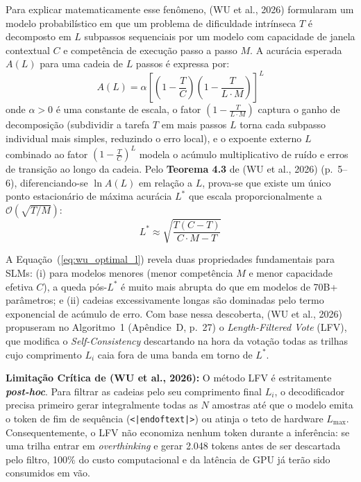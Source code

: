 \documentclass[9pt,conference]{IEEEtran}
\begin{document}
Para explicar matematicamente esse fen\^{o}meno, (WU et al., 2026) formularam um modelo probabil\'{i}stico em que um problema de dificuldade intr\'{i}nseca $T$ \'{e} decomposto em $L$ subpassos sequenciais por um modelo com capacidade de janela contextual $C$ e compet\^{e}ncia de execu\c{c}\~{a}o passo a passo $M$. A acur\'{a}cia esperada $A(L)$ para uma cadeia de $L$ passos \'{e} expressa por:
\begin{equation}
A(L) = \alpha \left[ \left(1 - \frac{T}{C}\right) \left(1 - \frac{T}{L \cdot M}\right) \right]^L
\label{eq:wu_inverted_u}
\end{equation}
onde $\alpha > 0$ \'{e} uma constante de escala, o fator $\left(1 - \frac{T}{L \cdot M}\right)$ captura o ganho de decomposi\c{c}\~{a}o (subdividir a tarefa $T$ em mais passos $L$ torna cada subpasso individual mais simples, reduzindo o erro local), e o expoente externo $L$ combinado ao fator $\left(1 - \frac{T}{C}\right)^L$ modela o ac\'{u}mulo multiplicativo de ru\'{i}do e erros de transi\c{c}\~{a}o ao longo da cadeia. Pelo \textbf{Teorema 4.3} de (WU et al., 2026) (p.~5--6), diferenciando-se $\ln A(L)$ em rela\c{c}\~{a}o a $L$, prova-se que existe um \'{u}nico ponto estacion\'{a}rio de m\'{a}xima acur\'{a}cia $L^*$ que escala proporcionalmente a $\mathcal{O}(\sqrt{T/M})$:
\begin{equation}
L^* \approx \sqrt{\frac{T(C - T)}{C \cdot M - T}}
\label{eq:wu_optimal_l}
\end{equation}

A Equa\c{c}\~{a}o~(\ref{eq:wu_optimal_l}) revela duas propriedades fundamentais para SLMs: (i) para modelos menores (menor compet\^{e}ncia $M$ e menor capacidade efetiva $C$), a queda p\'{o}s-$L^*$ \'{e} muito mais abrupta do que em modelos de 70B+ par\^{a}metros; e (ii) cadeias excessivamente longas s\~{a}o dominadas pelo termo exponencial de ac\'{u}mulo de erro. Com base nessa descoberta, (WU et al., 2026) propuseram no Algoritmo~1 (Ap\^{e}ndice~D, p.~27) o \textit{Length-Filtered Vote} (LFV), que modifica o \textit{Self-Consistency} descartando na hora da vota\c{c}\~{a}o todas as trilhas cujo comprimento $L_i$ caia fora de uma banda em torno de $L^*$.

\textbf{Limita\c{c}\~{a}o Cr\'{i}tica de (WU et al., 2026):} O m\'{e}todo LFV \'{e} estritamente \textbf{\textit{post-hoc}}. Para filtrar as cadeias pelo seu comprimento final $L_i$, o decodificador precisa primeiro gerar integralmente todas as $N$ amostras at\'{e} que o modelo emita o token de fim de sequ\^{e}ncia (\texttt{<|endoftext|>}) ou atinja o teto de hardware $L_{\max}$. Consequentemente, o LFV n\~{a}o economiza nenhum token durante a infer\^{e}ncia: se uma trilha entrar em \textit{overthinking} e gerar 2.048 tokens antes de ser descartada pelo filtro, 100\% do custo computacional e da lat\^{e}ncia de GPU j\'{a} ter\~{a}o sido consumidos em v\~{a}o.
\end{document}

